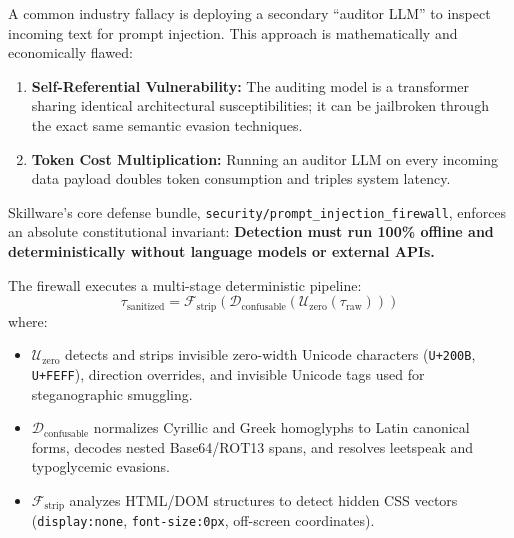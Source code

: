A common industry fallacy is deploying a secondary ``auditor LLM'' to inspect incoming text for prompt injection. This approach is mathematically and economically flawed:
\begin{enumerate}[leftmargin=*]
  \item \textbf{Self-Referential Vulnerability:} The auditing model is a transformer sharing identical architectural susceptibilities; it can be jailbroken through the exact same semantic evasion techniques.
  \item \textbf{Token Cost Multiplication:} Running an auditor LLM on every incoming data payload doubles token consumption and triples system latency.
\end{enumerate}

Skillware's core defense bundle, \texttt{security/\allowbreak prompt\_injection\_firewall}, enforces an absolute constitutional invariant: \textbf{Detection must run 100\% offline and deterministically without language models or external APIs.}

The firewall executes a multi-stage deterministic pipeline:
\begin{equation}
\label{eq:firewall_pipeline}
\tau_{\text{sanitized}} = \mathcal{F}_{\text{strip}}\left( \mathcal{D}_{\text{confusable}}\left( \mathcal{U}_{\text{zero}}(\tau_{\text{raw}}) \right) \right)
\end{equation}
where:
\begin{itemize}[leftmargin=*]
  \item $\mathcal{U}_{\text{zero}}$ detects and strips invisible zero-width Unicode characters (\texttt{U+200B}, \texttt{U+FEFF}), direction overrides, and invisible Unicode tags used for steganographic smuggling.
  \item $\mathcal{D}_{\text{confusable}}$ normalizes Cyrillic and Greek homoglyphs to Latin canonical forms, decodes nested Base64/ROT13 spans, and resolves leetspeak and typoglycemic evasions.
  \item $\mathcal{F}_{\text{strip}}$ analyzes HTML/DOM structures to detect hidden CSS vectors (\texttt{display:none}, \texttt{font-size:0px}, off-screen coordinates).
\end{itemize}

